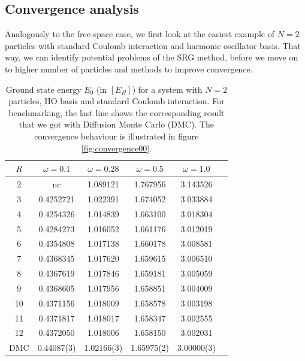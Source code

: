 \subsection{Convergence analysis}

Analogously to the free-space case, we first look at the easiest example of $N=2$ particles with standard Coulomb interaction and harmonic oscillator basis. 
That way, we can identify 
potential problems of the SRG method, before we move on to higher number of particles and methods to improve convergence.

\begin{table}
\begin{center}
\begin{tabular}{cccccc}
\hline\hline
$R$  & $\omega = 0.1$ & $\omega = 0.28$ & $\omega=0.5$ & $\omega=1.0$ \\
\hline
2  &nc & 1.089121&1.767956 &3.143526 \\
3  &0.4252721 &1.022391 &1.674052 &3.033884 \\
4  &0.4254326 &1.014839 &1.663100 &3.018304 \\
5  &0.4284273 &1.016052 &1.661176 &3.012019 \\
6  &0.4354808 &1.017138 &1.660178 & 3.008581\\
7  &0.4368345 &1.017620 &1.659615 &  3.006510\\
8  &0.4367619 &1.017846 &1.659181 & 3.005059\\
9  &0.4368605 &1.017956 &1.658851 &3.004009 \\
10 &0.4371156 &1.018009 &1.658578 &3.003198 \\
11 &0.4371817 &1.018017 &1.658347 &3.002555 \\
12 &0.4372050 &1.018006 &1.658150 &3.002031 \\
\hline
DMC &0.44087(3) &1.02166(3) &1.65975(2) &3.00000(3) \\ %
\hline\hline
\end{tabular}
\end{center}
\caption{Ground state energy $E_0$ (in $\left[E_H\right]$) for a system with $N=2$ particles, HO basis and standard Coulomb interaction. For benchmarking, the last line shows the corresponding result that we got with Diffusion Monte Carlo (DMC). The convergence behaviour is illustrated in figure \ref{fig:convergence00}.}
\label{tab:imsrg2-2part}
\end{table}


